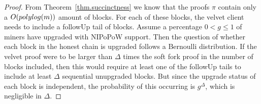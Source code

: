 \begin{proof}
    From Theorem~\ref{thm.succinctness} we know that the proofs $\pi$ contain
    only a $O(poly\-log(m))$ amount of blocks. For each of these blocks, the
    velvet client needs to include a followUp tail of blocks. Assume a
    percentage $0 < g \leq 1$ of miners have upgraded with NIPoPoW support.
    Then the question of whether each block in the honest chain is upgraded
    follows a Bernoulli distribution. If the velvet proof were to be larger
    than $\Delta$ times the soft fork proof in the number of blocks included,
    then this would require at least one of the followUp tails to include at
    least $\Delta$ sequential unupgraded blocks. But since the upgrade status
    of each block is independent, the probability of this occurring is
    $g^\Delta$, which is negligible in $\Delta$.
    \Qed
\end{proof}
